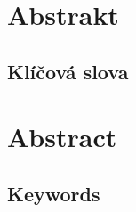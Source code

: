 \openright
\section*{Abstrakt}
\noindent
\Abstrakt
\subsection*{Klíčová slova}
\noindent
\KlicovaSlova

\bigskip\bigskip\bigskip
\section*{Abstract}
\noindent
\AbstraktEN
\subsection*{Keywords}
\noindent
\KlicovaSlovaEN

\openright
